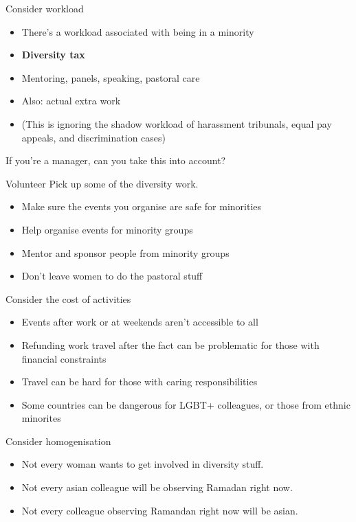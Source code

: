 \documentclass[xcolor=table]{beamer}
\begin{document}
\begin{frame}{Consider workload}
	\begin{itemize}
		\item There's a workload associated with being in a minority
		\item \textbf{Diversity tax}
		\item Mentoring, panels, speaking, pastoral care
		\item Also: actual extra work 
		\item (This is ignoring the shadow workload of harassment tribunals, equal pay appeals, and discrimination cases)
	\end{itemize}
	If you're a manager, can you take this into account?  
\end{frame}

\begin{frame}{Volunteer}
        Pick up some of the diversity work. 
	\begin{itemize}
		\item Make sure the events you organise are safe for minorities
		\item Help organise events for minority groups
		\item Mentor and sponsor people from minority groups 
		\item Don't leave women to do the pastoral stuff 
	\end{itemize}
\end{frame}
\begin{frame}{Consider the cost of activities}
	\begin{itemize}
		\item Events after work or at weekends aren't accessible to all
		\item Refunding work travel after the fact can be problematic for those with financial constraints
	\item Travel can be hard for those with caring responsibilities
	\item Some countries can be dangerous for LGBT+ colleagues, or those from ethnic minorites
	\end{itemize}
\end{frame}

\begin{frame}{Consider homogenisation}
	\begin{itemize}
		\item Not every woman wants to get involved in diversity stuff.
		\item Not every asian colleague will be observing Ramadan right now. 
		\item Not every colleague observing Ramandan right now will be asian.  
	\end{itemize}
\end{frame}
\end{document}
